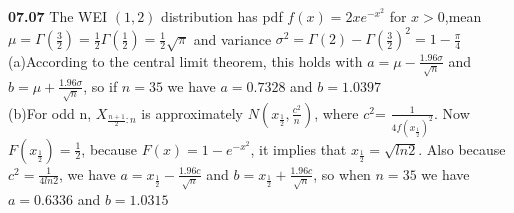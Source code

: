 {\bf 07.07}
The WEI $(1,2)$ distribution has pdf $f(x)=2xe^{-x^2}$ for $x>0$,mean $\mu=\Gamma(\frac{3}{2})=\frac{1}{2}\Gamma(\frac{1}{2})=\frac{1}{2}\sqrt{\pi}$
and variance $\sigma^2=\Gamma(2)-\Gamma(\frac{3}{2})^2=1-\frac{\pi}{4}$
\\
(a)According to the central limit theorem, this holds with $a=\mu-\frac{1.96\sigma}{\sqrt{n}}$ and $b=\mu+\frac{1.96\sigma}{\sqrt{n}}$, so if $n=35$ we have $a=0.7328$
and $b=1.0397$
\\
(b)For odd n, $X_{\frac{n+1}{2}:n}$ is approximately $N(x_{\frac{1}{2}},\frac{c^2}{n})$, where $c^2$=%
$\frac{1}{4f(x_\frac{1}{2})^2}$. Now $F(x_{\frac{1}{2}})=\frac{1}{2}$, because $F(x)=1-e^{-x^2}$, it implies that $x_\frac{1}{2}=\sqrt{ln2}$. Also because
$c^2=\frac{1}{4ln2}$, we have $a=x_{\frac{1}{2}}-\frac{1.96c}{\sqrt{n}}$ and $b=x_{\frac{1}{2}}+\frac{1.96c}{\sqrt{n}}$, so when $n=35$ we have $a=0.6336$ and
$b=1.0315$
\\
